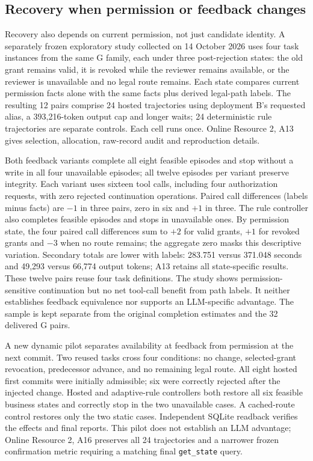 \documentclass[pdflatex,sn-basic]{sn-jnl}
\begin{document}
\subsection{Recovery when permission or feedback changes}\label{feedback-sensitivity}

Recovery also depends on current permission, not just candidate identity. A separately frozen exploratory study collected on 14 October 2026 uses four task instances from the same G family, each under three post-rejection states: the old grant remains valid, it is revoked while the reviewer remains available, or the reviewer is unavailable and no legal route remains. Each state compares current permission facts alone with the same facts plus derived legal-path labels. The resulting 12 pairs comprise 24 hosted trajectories using deployment B's requested alias, a 393,216-token output cap and longer waits; 24 deterministic rule trajectories are separate controls. Each cell runs once. Online Resource 2, A13 gives selection, allocation, raw-record audit and reproduction details.

Both feedback variants complete all eight feasible episodes and stop without a write in all four unavailable episodes; all twelve episodes per variant preserve integrity. Each variant uses sixteen tool calls, including four authorization requests, with zero rejected continuation operations. Paired call differences (labels minus facts) are $-1$ in three pairs, zero in six and $+1$ in three. The rule controller also completes feasible episodes and stops in unavailable ones. By permission state, the four paired call differences sum to $+2$ for valid grants, $+1$ for revoked grants and $-3$ when no route remains; the aggregate zero masks this descriptive variation. Secondary totals are lower with labels: 283.751 versus 371.048 seconds and 49,293 versus 66,774 output tokens; A13 retains all state-specific results. These twelve pairs reuse four task definitions. The study shows permission-sensitive continuation but no net tool-call benefit from path labels. It neither establishes feedback equivalence nor supports an LLM-specific advantage. The sample is kept separate from the original completion estimates and the 32 delivered G pairs.

A new dynamic pilot separates availability at feedback from permission at the next commit. Two reused tasks cross four conditions: no change, selected-grant revocation, predecessor advance, and no remaining legal route. All eight hosted first commits were initially admissible; six were correctly rejected after the injected change. Hosted and adaptive-rule controllers both restore all six feasible business states and correctly stop in the two unavailable cases. A cached-route control restores only the two static cases. Independent SQLite readback verifies the effects and final reports. This pilot does not establish an LLM advantage; Online Resource 2, A16 preserves all 24 trajectories and a narrower frozen confirmation metric requiring a matching final \texttt{get\_state} query.
\end{document}
